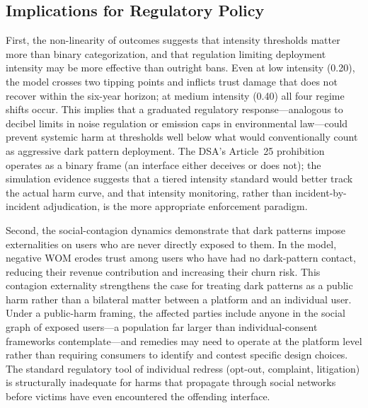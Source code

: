 \documentclass[a4paper,fleqn]{cas-sc}
\begin{document}
\subsection{Implications for Regulatory Policy}
First, the non-linearity of outcomes suggests that intensity thresholds matter more than binary categorization, and that regulation limiting deployment intensity may be more effective than outright bans. Even at low intensity (0.20), the model crosses two tipping points and inflicts trust damage that does not recover within the six-year horizon; at medium intensity (0.40) all four regime shifts occur. This implies that a graduated regulatory response---analogous to decibel limits in noise regulation or emission caps in environmental law---could prevent systemic harm at thresholds well below what would conventionally count as aggressive dark pattern deployment. The DSA's Article~25 prohibition operates as a binary frame (an interface either deceives or does not); the simulation evidence suggests that a tiered intensity standard would better track the actual harm curve, and that intensity monitoring, rather than incident-by-incident adjudication, is the more appropriate enforcement paradigm.

Second, the social-contagion dynamics demonstrate that dark patterns impose externalities on users who are never directly exposed to them. In the model, negative WOM erodes trust among users who have had no dark-pattern contact, reducing their revenue contribution and increasing their churn risk. This contagion externality strengthens the case for treating dark patterns as a public harm \citep{oecd2022} rather than a bilateral matter between a platform and an individual user. Under a public-harm framing, the affected parties include anyone in the social graph of exposed users---a population far larger than individual-consent frameworks contemplate---and remedies may need to operate at the platform level rather than requiring consumers to identify and contest specific design choices. The standard regulatory tool of individual redress (opt-out, complaint, litigation) is structurally inadequate for harms that propagate through social networks before victims have even encountered the offending interface.
\end{document}
